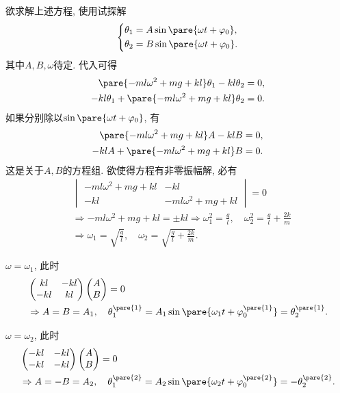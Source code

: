 \documentclass{ctexart}
\begin{document}
欲求解上述方程, 使用试探解
\[ \left\{\begin{aligned}
    \theta_1 &= A\sin\pare{\omega t + \varphi_0}, \\
    \theta_2 &= B\sin\pare{\omega t + \varphi_0}.
\end{aligned}\right. \]
其中$A,B,\omega$待定. 代入可得
\begin{align*}
    \pare{-ml\omega^2+mg+kl} \theta_1 - kl\theta_2 &= 0, \\
    -kl\theta_1 + \pare{-ml\omega^2 + mg + kl}\theta_2 &= 0.
\end{align*}
如果分别除以$\sin\pare{\omega t + \varphi_0}$, 有
\begin{align*}
    \pare{-ml\omega^2+mg+kl} A - kl B &= 0, \\
    -klA + \pare{-ml\omega^2 + mg + kl} B &= 0.
\end{align*}
这是关于$A, B$的方程组. 欲使得方程有非零振幅解, 必有
\begin{align*}
    & \begin{vmatrix}
    {-ml\omega^2+mg+kl} & - kl \\
    -kl & {-ml\omega^2 + mg + kl}
\end{vmatrix} = 0 \\ &\Rightarrow {-ml\omega^2+mg+kl} = \pm kl \Rightarrow \omega_1^2 = \frac{g}{l},\quad \omega_2^2 = \frac{g}{l}+\frac{2k}{m} \\
&\Rightarrow \omega_1 = \sqrt{\frac{g}{l}},\quad \omega_2 = \sqrt{\frac{g}{l} + \frac{2k}{m}}.
\end{align*}
\begin{cenum}
    \item $\omega = \omega_1$, 此时
    \begin{align*}
        & \begin{pmatrix}
        kl & -kl \\ -kl & kl
    \end{pmatrix} \begin{pmatrix}
        A \\ B
    \end{pmatrix} = 0 \\ &\Rightarrow A = B = A_1,\quad \theta_1^{\pare{1}} = A_1\sin\pare{\omega_1 t + \varphi_0^{\pare{1}}} = \theta_2^{\pare{1}}.
    \end{align*}
    \item $\omega = \omega_2$, 此时
    \begin{align*}
        & \begin{pmatrix}
        -kl & -kl \\
        -kl & -kl
    \end{pmatrix} \begin{pmatrix}
        A \\ B
    \end{pmatrix} = 0 \\ &\Rightarrow A = -B = A_2,\quad \theta_1^{\pare{2}} = A_2\sin\pare{\omega_2 t + \varphi_0^{\pare{2}}} = -\theta_2^{\pare{2}}.
    \end{align*}
\end{cenum}
\end{document}
